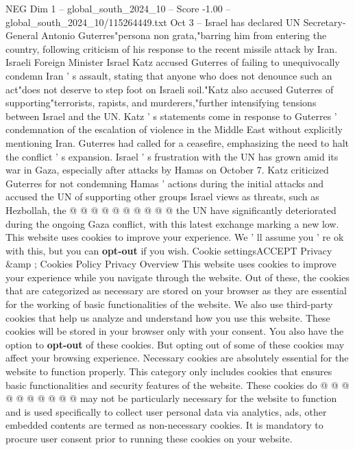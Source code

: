 \begin{textsample}{NEG Dim 1 – global\_south\_2024\_10 – Score -1.00 – global\_south\_2024\_10/115264449.txt}  \label{ex:f1_neg_279}
Oct 3 -- Israel has declared UN Secretary-General Antonio Guterres"persona non grata,"barring him from entering the country, following criticism of his response to the recent missile attack by Iran.
Israeli Foreign Minister Israel Katz accused Guterres of failing to unequivocally condemn Iran ' s assault, stating that anyone who does not denounce such an act"does not deserve to step foot on Israeli soil."Katz also accused Guterres of supporting"terrorists, rapists, and murderers,"further intensifying tensions between Israel and the UN.
Katz ' s statements come in response to Guterres ' condemnation of the escalation of violence in the Middle East without explicitly mentioning Iran.
Guterres had called for a ceasefire, emphasizing the need to halt the conflict ' s expansion.
Israel ' s frustration with the UN has grown amid its war in Gaza, especially after attacks by Hamas on October 7.
Katz criticized Guterres for not condemning Hamas ' actions during the initial attacks and accused the UN of supporting other groups Israel views as threats, such as Hezbollah, the @ @ @ @ @ @ @ @ @ @ the UN have significantly deteriorated during the ongoing Gaza conflict, with this latest exchange marking a new low.
This website uses cookies to improve your experience.
We ' ll assume you ' re ok with this, but you can \textbf{opt-out} if you wish.
Cookie settingsACCEPT Privacy \&amp ; Cookies Policy Privacy Overview This website uses cookies to improve your experience while you navigate through the website.
Out of these, the cookies that are categorized as necessary are stored on your browser as they are essential for the working of basic functionalities of the website.
We also use third-party cookies that help us analyze and understand how you use this website.
These cookies will be stored in your browser only with your consent.
You also have the option to \textbf{opt-out} of these cookies.
But opting out of some of these cookies may affect your browsing experience.
Necessary cookies are absolutely essential for the website to function properly.
This category only includes cookies that ensures basic functionalities and security features of the website.
These cookies do @ @ @ @ @ @ @ @ @ @ may not be particularly necessary for the website to function and is used specifically to collect user personal data via analytics, ads, other embedded contents are termed as non-necessary cookies.
It is mandatory to procure user consent prior to running these cookies on your website.

\end{textsample}
